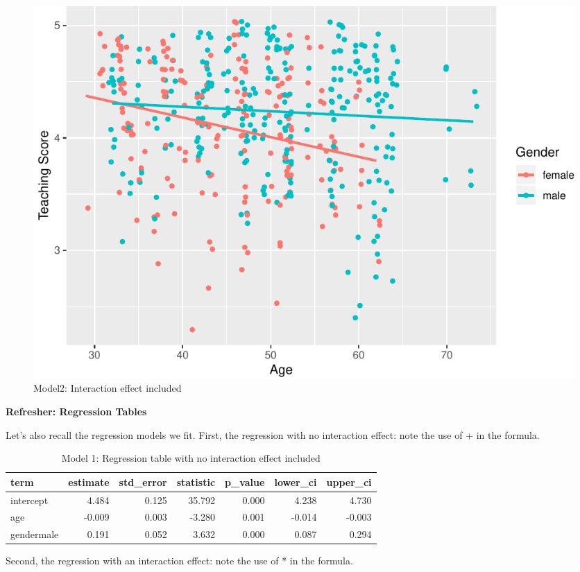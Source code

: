 \documentclass[]{article}
\begin{document}
\begin{figure}

{\centering \includegraphics[width=0.85\linewidth]{DAWeek8_files/figure-latex/plot2-1} 

}

\caption{\label{fig:plot2}Model2: Interaction effect included}\label{fig:plot2}
\end{figure}

\newpage  

\textbf{Refresher: Regression Tables}

Let's also recall the regression models we fit. First, the regression
with no interaction effect: note the use of + in the formula.

\begin{table}[!h]

\caption{\label{tab:table2}Model 1: Regression table with no interaction effect included}
\centering
\begin{tabular}[t]{lrrrrrr}
\toprule
term & estimate & std\_error & statistic & p\_value & lower\_ci & upper\_ci\\
\midrule
intercept & 4.484 & 0.125 & 35.792 & 0.000 & 4.238 & 4.730\\
age & -0.009 & 0.003 & -3.280 & 0.001 & -0.014 & -0.003\\
gendermale & 0.191 & 0.052 & 3.632 & 0.000 & 0.087 & 0.294\\
\bottomrule
\end{tabular}
\end{table}

Second, the regression with an interaction effect: note the use of * in
the formula.
\end{document}

